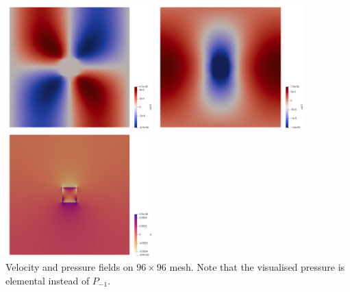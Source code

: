 \begin{center}
\includegraphics[width=5.7cm]{python_codes/fieldstone_76/results/block_rd/u}
\includegraphics[width=5.7cm]{python_codes/fieldstone_76/results/block_rd/v}
\includegraphics[width=5.7cm]{python_codes/fieldstone_76/results/block_rd/press}\\
{\captionfont Velocity and pressure fields on $96\times 96$ mesh. 
Note that the visualised pressure is elemental instead of $P_{-1}$.}
\end{center}




